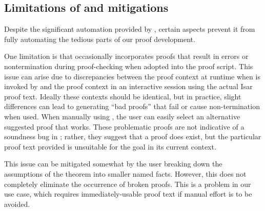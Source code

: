 \documentclass[10pt,conference]{IEEEtran}
\begin{document}



\subsection{Limitations of \supersketch{} and mitigations}
Despite the significant automation provided by \supersketch{}, certain aspects prevent it from fully automating the tedious parts of our proof development.

One limitation is that \supersketch{} occasionally incorporates \sledgehammer{} proofs that result in errors or 
nontermination during proof-checking when adopted into the proof script. 
This issue can arise due to discrepancies between the proof context at runtime when \sledgehammer{} is invoked by \supersketch{} and the proof context in an interactive session using the actual Isar proof text. Ideally these contexts should be identical, but in practice, slight differences can lead to \sledgehammer{} generating ``bad proofs'' that fail or cause non-termination when used.
When manually using \sledgehammer{}, the user can easily select an alternative suggested proof that works. These problematic proofs are not indicative of a soundness bug in \sledgehammer{}; rather, they suggest that a proof does exist, but the particular proof text provided is unsuitable for the goal in its current context.



This issue can be mitigated somewhat by the user breaking down the assumptions of the theorem into smaller named facts.
%
However, this does not completely eliminate the occurrence of broken proofs.
This is a problem in our use case,
which requires immediately-usable proof text
if manual effort is to be avoided.
\end{document}
